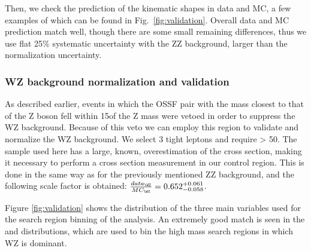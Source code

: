 Then, we check the prediction of the kinematic shapes in data and MC,
a few examples of which can be found in
Fig.~\ref{fig:validation}. Overall data and MC prediction match well,
though there are some small remaining differences, thus we use flat 25\% systematic uncertainty with the ZZ background, larger than the normalization uncertainty.

\subsubsection{WZ background normalization and validation}
As described earlier, events in which the OSSF pair with the mass
closest to that of the Z boson fell within 15\GeV of the Z mass were
vetoed in order to suppress the WZ background. Because of this veto we
can employ this region to validate and normalize the WZ background. We
select 3 tight leptons and require \ptmiss> 50\GeV.
The sample used here has a large, known, overestimation of
the cross section, making it necessary to perform a cross section
measurement in our control region. This is done in the same way as for
the previously mentioned ZZ background, and the following scale factor
is obtained: $\frac{data_{\WZ}}{MC_{\WZ}} = 0.652_{-0.058}^{+0.061}$.

Figure \ref{fig:validation} shows the distribution of the three main variables used for the search region binning of the analysis. An extremely good match is seen in the \mmin  and \mtmin  distributions, which are used to bin the high mass search regions in which WZ is dominant.


